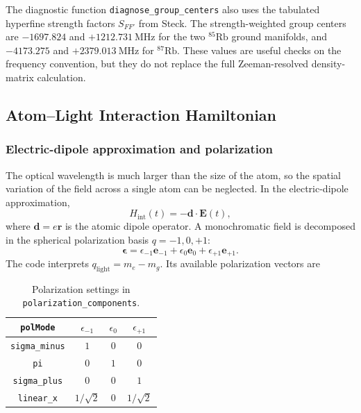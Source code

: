 The diagnostic function \texttt{diagnose\_group\_centers} also uses the
tabulated hyperfine strength factors \(S_{FF'}\) from Steck.  The
strength-weighted group centers are \(-1697.824\) and \(+1212.731~\mathrm{MHz}\)
for the two \(^{85}\mathrm{Rb}\) ground manifolds, and \(-4173.275\) and
\(+2379.013~\mathrm{MHz}\) for \(^{87}\mathrm{Rb}\).  These values are useful
checks on the frequency convention, but they do not replace the full
Zeeman-resolved density-matrix calculation.

\subsection{Atom--Light Interaction Hamiltonian}
\label{subsec:dm_interaction}

\subsubsection{Electric-dipole approximation and polarization}

The optical wavelength is much larger than the size of the atom, so the
spatial variation of the field across a single atom can be neglected.  In the
electric-dipole approximation,
\begin{equation}
H_{\mathrm{int}}(t)=-\mathbf{d}\cdot\mathbf{E}(t),
\label{eq:electric_dipole_interaction}
\end{equation}
where \(\mathbf{d}=e\mathbf{r}\) is the atomic dipole operator.  A
monochromatic field is decomposed in the spherical polarization basis
\(q=-1,0,+1\):
\begin{equation}
\boldsymbol{\epsilon}
=
\epsilon_{-1}\mathbf{e}_{-1}
+
\epsilon_{0}\mathbf{e}_{0}
+
\epsilon_{+1}\mathbf{e}_{+1}.
\label{eq:spherical_polarization}
\end{equation}
The code interprets \(q_{\mathrm{light}}=m_e-m_g\).  Its available
polarization vectors are
\begin{table}[t]
\centering
\small
\caption{Polarization settings in \texttt{polarization\_components}.}
\label{tab:dm_polarizations}
\begin{tabular}{cccc}
\toprule
\texttt{polMode} & \(\epsilon_{-1}\) & \(\epsilon_0\) & \(\epsilon_{+1}\) \\
\midrule
\texttt{sigma\_minus} & \(1\) & \(0\) & \(0\) \\
\texttt{pi}           & \(0\) & \(1\) & \(0\) \\
\texttt{sigma\_plus}  & \(0\) & \(0\) & \(1\) \\
\texttt{linear\_x}    & \(1/\sqrt{2}\) & \(0\) & \(1/\sqrt{2}\) \\
\bottomrule
\end{tabular}
\end{table}

